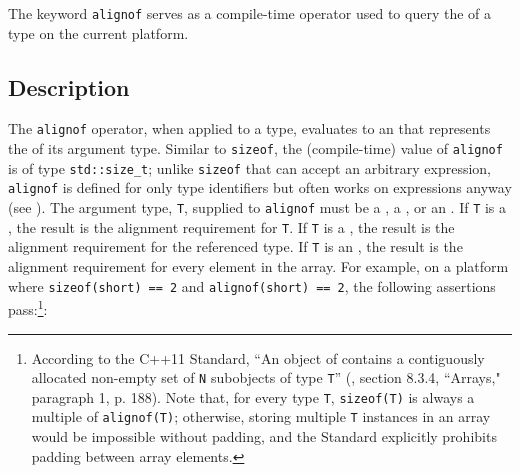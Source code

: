 
\setcounter{table}{0}
\setcounter{footnote}{0}
\setcounter{lstlisting}{0}

The keyword \lstinline!alignof! serves as a compile-time operator used to
query the  of a type on the current
platform.

\subsection[Description]{Description}\label{description}

The \lstinline!alignof! operator, when applied to a type, evaluates to an
 that represents the
 of its argument type. Similar to
\lstinline!sizeof!, the (compile-time) value of \lstinline!alignof! is of type
\lstinline!std::size_t!; unlike \lstinline!sizeof! that can accept an
arbitrary expression, \lstinline!alignof! is defined for only type identifiers but often works on expressions
anyway (see ). The argument type,
\lstinline!T!, supplied to \lstinline!alignof! must be a
, a , or an . If \lstinline!T! is a , the result is the
alignment requirement for \lstinline!T!. If \lstinline!T! is a
, the result is the alignment requirement for the
referenced type. If \lstinline!T! is an , the
result is the alignment requirement for every element in the array. For example, on a platform where \lstinline!sizeof(short)!~\lstinline!==!~\lstinline!2! and \lstinline!alignof(short)!~\lstinline!==!~\lstinline!2!, the following assertions pass:{\cprotect\footnote{According to the C++11 Standard, ``An object of  contains a contiguously allocated
  non-empty set of \lstinline!N! subobjects of type \lstinline!T!''  (\cite{cpp11}, section 8.3.4, ``Arrays," paragraph 1, p. 188). Note
  that, for every type \lstinline!T!, \lstinline!sizeof(T)! is always a
  multiple of \lstinline!alignof(T)!; otherwise, storing multiple \lstinline!T! instances in an array would be impossible without padding,
  and the Standard explicitly prohibits padding between array elements.}}:

